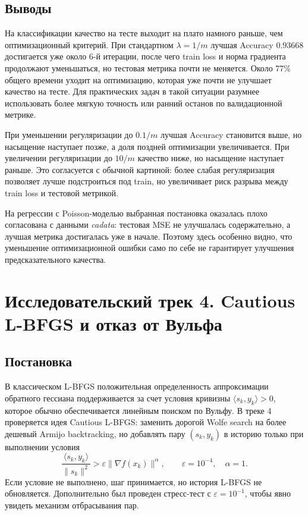 \documentclass[a4paper,12pt]{article}
\begin{document}
\subsection*{Выводы}
На классификации качество на тесте выходит на плато намного раньше, чем оптимизационный критерий. При стандартном $\lambda=1/m$ лучшая Accuracy $0.93668$ достигается уже около 6-й итерации, после чего train loss и норма градиента продолжают уменьшаться, но тестовая метрика почти не меняется. Около 77\% общего времени уходит на оптимизацию, которая уже почти не улучшает качество на тесте. Для практических задач в такой ситуации разумнее использовать более мягкую точность или ранний останов по валидационной метрике.

При уменьшении регуляризации до $0.1/m$ лучшая Accuracy становится выше, но насыщение наступает позже, а доля поздней оптимизации увеличивается. При увеличении регуляризации до $10/m$ качество ниже, но насыщение наступает раньше. Это согласуется с обычной картиной: более слабая регуляризация позволяет лучше подстроиться под train, но увеличивает риск разрыва между train loss и тестовой метрикой.

На регрессии с Poisson-моделью выбранная постановка оказалась плохо согласована с данными \textit{cadata}: тестовая MSE не улучшалась содержательно, а лучшая метрика достигалась уже в начале. Поэтому здесь особенно видно, что уменьшение оптимизационной ошибки само по себе не гарантирует улучшения предсказательного качества.

\section{Исследовательский трек 4. Cautious L-BFGS и отказ от Вульфа}

\subsection*{Постановка}
В классическом L-BFGS положительная определенность аппроксимации обратного гессиана поддерживается за счет условия кривизны $\langle s_k, y_k\rangle>0$, которое обычно обеспечивается линейным поиском по Вульфу. В треке 4 проверяется идея Cautious L-BFGS: заменить дорогой Wolfe search на более дешевый Armijo backtracking, но добавлять пару $(s_k,y_k)$ в историю только при выполнении условия
\[
    \frac{\langle s_k,y_k\rangle}{\|s_k\|^2} > \varepsilon \|\nabla f(x_k)\|^\alpha,
    \qquad \varepsilon=10^{-4},\quad \alpha=1.
\]
Если условие не выполнено, шаг принимается, но история L-BFGS не обновляется. Дополнительно был проведен стресс-тест с $\varepsilon=10^{-1}$, чтобы явно увидеть механизм отбрасывания пар.
\end{document}
